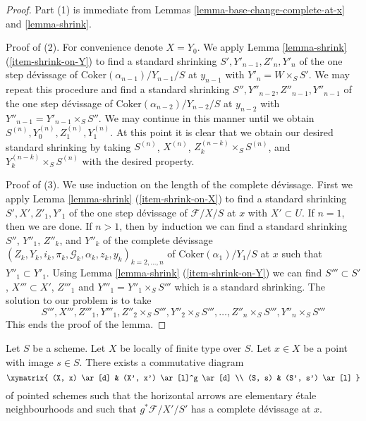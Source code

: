 \begin{proof}
Part (1) is immediate from
Lemmas \ref{lemma-base-change-complete-at-x} and
\ref{lemma-shrink}.

\medskip\noindent
Proof of (2). For convenience denote $X = Y_0$. We apply
Lemma \ref{lemma-shrink} (\ref{item-shrink-on-Y})
to find a standard shrinking
$S', Y'_{n - 1}, Z'_n, Y'_n$
of the one step d\'evissage of $\text{Coker}(\alpha_{n - 1})/Y_{n - 1}/S$
at $y_{n - 1}$ with $Y'_n = W \times_S S'$. We may repeat this procedure
and find a standard shrinking
$S'', Y''_{n - 2}, Z''_{n - 1}, Y''_{n - 1}$
of the one step d\'evissage of $\text{Coker}(\alpha_{n - 2})/Y_{n - 2}/S$
at $y_{n - 2}$ with $Y''_{n - 1} = Y'_{n - 1} \times_S S''$.
We may continue in this manner until we obtain
$S^{(n)}, Y^{(n)}_0, Z^{(n)}_1, Y^{(n)}_1$.
At this point it is clear that we obtain our desired standard shrinking
by taking $S^{(n)}$, $X^{(n)}$, $Z_k^{(n - k)} \times_S S^{(n)}$, and
$Y_k^{(n - k)} \times_S S^{(n)}$ with the desired property.

\medskip\noindent
Proof of (3). We use induction on the length of the complete
d\'evissage. First we apply
Lemma \ref{lemma-shrink} (\ref{item-shrink-on-X})
to find a standard shrinking
$S', X', Z'_1, Y'_1$
of the one step d\'evissage of $\mathcal{F}/X/S$ at $x$
with $X' \subset U$. If $n = 1$, then we are done.
If $n > 1$, then by induction we can find a standard shrinking
$S''$, $Y''_1$, $Z''_k$, and $Y''_k$ of the complete d\'evissage
$(Z_k, Y_k, i_k, \pi_k, \mathcal{G}_k, \alpha_k, z_k, y_k)_{k = 2, \ldots, n}$
of $\text{Coker}(\alpha_1)/Y_1/S$ at $x$ such that
$Y''_1 \subset Y'_1$. Using
Lemma \ref{lemma-shrink} (\ref{item-shrink-on-Y})
we can find $S''' \subset S'$, $X''' \subset X'$, $Z'''_1$ and
$Y'''_1 = Y''_1 \times_S S'''$ which is a standard shrinking.
The solution to our problem is to take
$$
S''', X''', Z'''_1, Y'''_1, Z''_2 \times_S S''',
Y''_2 \times_S S''', \ldots, Z''_n \times_S S''', Y''_n \times_S S'''
$$
This ends the proof of the lemma.
\end{proof}

\begin{proposition}
\label{proposition-existence-complete-at-x}
Let $S$ be a scheme.
Let $X$ be locally of finite type over $S$.
Let $x \in X$ be a point with image $s \in S$.
There exists a commutative diagram
$$
\xymatrix{
(X, x) \ar[d] & (X', x') \ar[l]^g \ar[d] \\
(S, s) & (S', s') \ar[l]
}
$$
of pointed schemes such that the horizontal
arrows are elementary \'etale neighbourhoods
and such that $g^*\mathcal{F}/X'/S'$ has a complete
d\'evissage at $x$.
\end{proposition}

